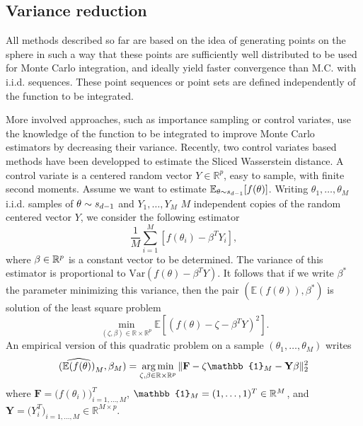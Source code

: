 \subsection{Variance reduction} \label{sec:CV}
All methods described so far are based on the idea of generating points on the 
sphere in such a way that these points are sufficiently well distributed to be used 
for Monte Carlo integration, and ideally yield faster convergence than 
{M.C.}
with i.i.d. sequences. These point sequences or point sets are defined 
independently of the function to be integrated. 

More involved approaches, such as importance sampling or control variates, use the knowledge of the function to be integrated to improve Monte Carlo estimators by decreasing their variance. 
Recently, two control variates based methods have been developped to estimate the Sliced Wasserstein distance.
A control variate is a centered random vector $Y \in \mathbb{R}^p$, easy to sample, with finite second moments. Assume we want to estimate $\mathbb{E}_{\theta \sim s_{d-1}}[f(\theta)]$. Writing $\theta_1,\hdots,\theta_M$ i.i.d. samples of $\theta \sim s_{d-1}$ and  {$Y_1,\hdots,Y_M$ $M$} independent copies of the random centered vector $Y$, we consider the following estimator 
\begin{equation*}
     \displaystyle\frac{1}{M}\sum\limits_{i=1}^M [f(\theta_i) - \beta^T Y_i],
\end{equation*}
where $\beta \in \mathbb{R}^p$ is a constant vector to be determined. The variance of this estimator is proportional to $\mathrm{Var}(f(\theta) - \beta^T Y)$.
It follows that if we write $\beta^*$ the parameter minimizing this variance, then the pair $(\mathbb{E}(f(\theta)),\beta^*)$ is solution of the least square problem
\[\min_{(\zeta,\beta)\in \mathbb{R}\times \mathbb{R}^p} \mathbb{E}[(f(\theta) - \zeta - \beta^TY )^2].\]
An empirical version of this quadratic problem on a sample $(\theta_1,\hdots,\theta_M)$ writes
\begin{equation}\label{eq:leastSquares}
    (\widehat{\mathbb{E}(f(\theta))}_M,\beta_M)= \argmin_{\zeta,\beta\in\R\times\R^p} \| \textbf{F} -\zeta \mathbb{1}_M -\textbf{Y}\beta\|_2^2
\end{equation}
where {$\textbf{F} = \big(f(\theta_i)\big)^T_{i = 1,\hdots,M}$, $\mathbb{1}_M = (1,\hdots,1)^T\in\R^M$, and $\textbf{Y} = \big(Y_i^T\big)_{i = 1,\hdots,M}\in \mathbb{R}^{M\times p}$}. 


